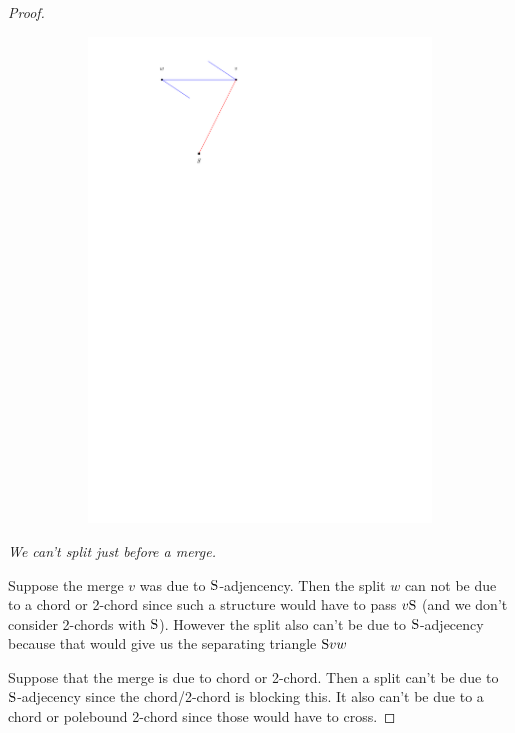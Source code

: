 \begin{proof}
\begin{figure}
\begin{subfigure}[b]{0.45 \textwidth}
              \includegraphics[width =\textwidth]{unifiedAlgo/img/sweep/mergeAfterSplit1}
              \caption{}
              \label{fig:sweep:}
          \end{subfigure}
          	\caption{}
            \label{}
      \end{figure}


      \vspace{2ex}
      \emph{We can't split just before a merge.}

      Suppose the merge $v$ was due to $\mathrm{S}$-adjencency. Then the split $w$ can not be due to a chord or 2-chord since such a structure would have to pass $v \mathrm{S}$ (and we don't consider 2-chords with $\mathrm{S}$). However the split also can't be due to $\mathrm{S}$-adjecency because that would give us the separating triangle $\mathrm{S} v w$

      Suppose that the merge is due to chord or 2-chord. Then a split can't be due to $\mathrm{S}$-adjecency since the chord/2-chord is blocking this. It also can't be due to a chord or polebound 2-chord since those would have to cross.
    \end{proof}

